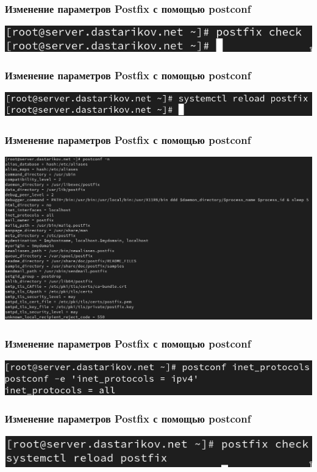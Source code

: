 \begin{frame}
\frametitle{Изменение параметров Postfix с помощью postconf}
    \includegraphics[width=\textwidth]{../images/image05.png}
\end{frame}
\begin{frame}
\frametitle{Изменение параметров Postfix с помощью postconf}
    \centering
    \includegraphics[width=\textwidth]{../images/image07.png}
\end{frame}
\begin{frame}
\frametitle{Изменение параметров Postfix с помощью postconf}
    \centering
    \includegraphics[width=\textwidth]{../images/image08.png}
\end{frame}
\begin{frame}
\frametitle{Изменение параметров Postfix с помощью postconf}
    \centering
    \includegraphics[width=\textwidth]{../images/image09.png}
\end{frame}
\begin{frame}
\frametitle{Изменение параметров Postfix с помощью postconf}
    \centering
    \includegraphics[width=\textwidth]{../images/image10.png}
\end{frame}
